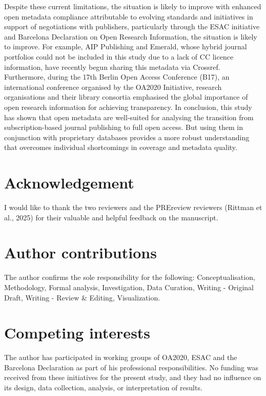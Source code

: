 \documentclass[a4paper,man,floatsintext,longtable,noextraspace,10pt]{apa6}
\begin{document}
Despite these current limitations, the situation is likely to improve
with enhanced open metadata compliance attributable to evolving
standards and initiatives in support of negotiations with publishers,
particularly through the ESAC initiative and Barcelona Declaration on
Open Research Information, the situation is likely to improve. For
example, AIP Publishing and Emerald, whose hybrid journal portfolios
could not be included in this study due to a lack of CC licence
information, have recently begun sharing this metadata via Crossref.
Furthermore, during the 17th Berlin Open Access Conference (B17), an
international conference organised by the OA2020 Initiative, research
organisations and their library consortia emphasised the global
importance of open research information for achieving transparency. In
conclusion, this study has shown that open metadata are well-suited for
analysing the transition from subscription-based journal publishing to
full open access. But using them in conjunction with proprietary
databases provides a more robust understanding that overcomes individual
shortcomings in coverage and metadata quality.

\section*{Acknowledgement}\label{acknowledgement}

I would like to thank the two reviewers and the PREreview reviewers
(Rittman et al., 2025) for their valuable and helpful feedback on the
manuscript.

\section*{Author contributions}\label{author-contributions}

The author confirms the sole responsibility for the following:
Conceptualisation, Methodology, Formal analysis, Investigation, Data
Curation, Writing - Original Draft, Writing - Review \& Editing,
Visualization.

\section*{Competing interests}\label{competing-interests}

The author has participated in working groups of OA2020, ESAC and the
Barcelona Declaration as part of his professional responsibilities. No
funding was received from these initiatives for the present study, and
they had no influence on its design, data collection, analysis, or
interpretation of results.
\end{document}
